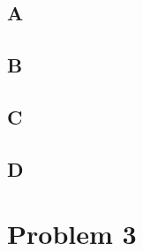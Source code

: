 \documentclass{article}
\begin{document}
        \subsection{A}
        \subsection{B}
        \subsection{C}
        \subsection{D}
    \newpage
    \section{Problem 3}
\end{document}
